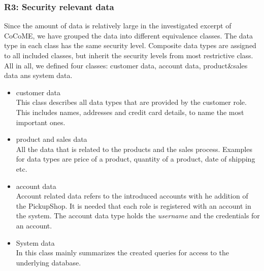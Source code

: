 \subsubsection{R3: Security relevant data}
\label{req_data}
Since the amount of data is relatively large in the investigated excerpt of CoCoME, we have grouped the data into different equivalence classes. The data type in each class has the same security level. Composite data types are assigned to all included classes, but inherit the security levels from most restrictive class. All in all, we defined four classes: customer data, account data, product\&sales data ans system data. 
\begin{itemize}
\item customer data\\ This class describes all data types that are provided by the customer role. This includes names, addresses and credit card details, to name the most important ones. %
\item product and sales data \\ All the data that is related to the products and the sales process. Examples for data types are price of a product, quantity of a product, date of shipping etc. %
\item account data \\ Account related data refers to the introduced accounts with he addition of the PickupShop. It is needed that each role is registered with an account in the system. The account data type holds the \textit{username} and the credentials for an account. %
\item System data \\ In this class mainly summarizes the created queries for access to the underlying database. %
\end{itemize}
